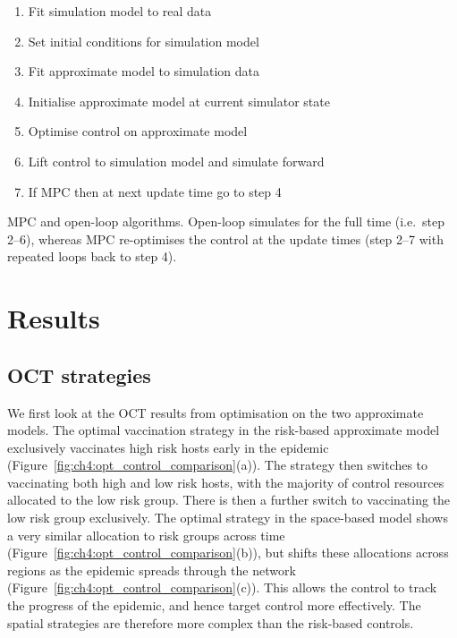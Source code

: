 \vspace*{\floatsep}
\begin{algorithm}
    \begin{enumerate}
        \item{}Fit simulation model to real data
        \item{}Set initial conditions for simulation model
        \item{}Fit approximate model to simulation data
        \item{}Initialise approximate model at current simulator state
        \item{}Optimise control on approximate model
        \item{}Lift control to simulation model and simulate forward
        \item{}If MPC then at next update time go to step 4
    \end{enumerate}
\caption{MPC and open-loop algorithms. Open-loop simulates for the full time (i.e.\ step 2--6), whereas MPC re-optimises the control at the update times (step 2--7 with repeated loops back to step 4).\label{alg:ch4:ol_mpc}}
\end{algorithm}

\FloatBarrier
\newpage
\section{Results\label{sec:ch4:Results}}

\subsection{OCT strategies}

We first look at the OCT results from optimisation on the two approximate models. The optimal vaccination strategy in the risk-based approximate model exclusively vaccinates high risk hosts early in the epidemic (Figure~\ref{fig:ch4:opt_control_comparison}(a)). The strategy then switches to vaccinating both high and low risk hosts, with the majority of control resources allocated to the low risk group. There is then a further switch to vaccinating the low risk group exclusively. The optimal strategy in the space-based model shows a very similar allocation to risk groups across time (Figure~\ref{fig:ch4:opt_control_comparison}(b)), but shifts these allocations across regions as the epidemic spreads through the network (Figure~\ref{fig:ch4:opt_control_comparison}(c)). This allows the control to track the progress of the epidemic, and hence target control more effectively. The spatial strategies are therefore more complex than the risk-based controls.

